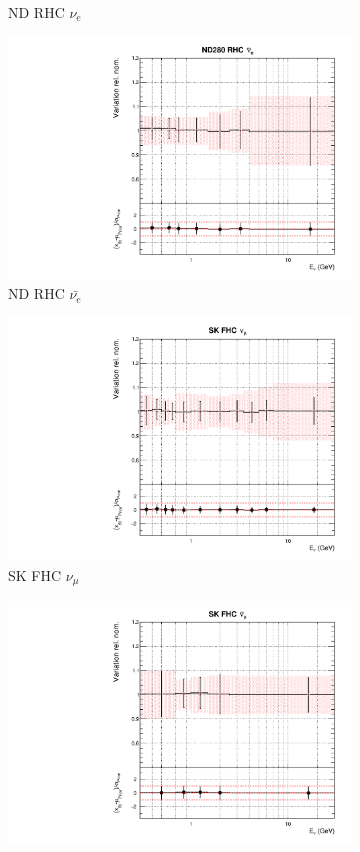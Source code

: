 \begin{figure}
\begin{subfigure}{0.24\textwidth}
  \caption{ND RHC $\nu_{e}$}
\end{subfigure}
\vspace{15mm}
\begin{subfigure}{0.24\textwidth}
  \centering
  \includegraphics[width=0.95\linewidth]{figs/asmvflux7}
  \caption{ND RHC $\bar{\nu_e}$}
\end{subfigure}
\begin{subfigure}{0.24\textwidth}
  \centering
  \includegraphics[width=0.95\linewidth]{figs/asmvflux8}
  \caption{SK FHC $\nu_{\mu}$}
\end{subfigure}
\begin{subfigure}{0.24\textwidth}
  \centering
  \includegraphics[width=0.95\linewidth]{figs/asmvflux9}

\end{subfigure}
\end{figure}
